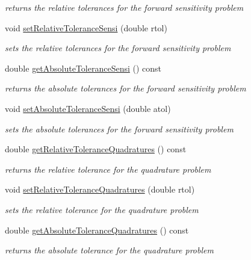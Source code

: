\begin{DoxyCompactItemize}
\begin{DoxyCompactList}\small\item\em returns the relative tolerances for the forward sensitivity problem \end{DoxyCompactList}\item 
void \mbox{\hyperlink{classamici_1_1_solver_a140b4219a601b17daf5f90f2255d1f22}{set\+Relative\+Tolerance\+Sensi}} (double rtol)
\begin{DoxyCompactList}\small\item\em sets the relative tolerances for the forward sensitivity problem \end{DoxyCompactList}\item 
double \mbox{\hyperlink{classamici_1_1_solver_aef5bbdb68233061923a99a5f448b263a}{get\+Absolute\+Tolerance\+Sensi}} () const
\begin{DoxyCompactList}\small\item\em returns the absolute tolerances for the forward sensitivity problem \end{DoxyCompactList}\item 
void \mbox{\hyperlink{classamici_1_1_solver_a6f804c48badcbc0dc32da4379c7ff091}{set\+Absolute\+Tolerance\+Sensi}} (double atol)
\begin{DoxyCompactList}\small\item\em sets the absolute tolerances for the forward sensitivity problem \end{DoxyCompactList}\item 
double \mbox{\hyperlink{classamici_1_1_solver_a40124a6593fea7f5ddbf39385b021a9e}{get\+Relative\+Tolerance\+Quadratures}} () const
\begin{DoxyCompactList}\small\item\em returns the relative tolerance for the quadrature problem \end{DoxyCompactList}\item 
void \mbox{\hyperlink{classamici_1_1_solver_a086428d30274f2b7e6f94e8e7593dd8b}{set\+Relative\+Tolerance\+Quadratures}} (double rtol)
\begin{DoxyCompactList}\small\item\em sets the relative tolerance for the quadrature problem \end{DoxyCompactList}\item 
double \mbox{\hyperlink{classamici_1_1_solver_a1f50a4e21784c2757530068483c405cb}{get\+Absolute\+Tolerance\+Quadratures}} () const
\begin{DoxyCompactList}\small\item\em returns the absolute tolerance for the quadrature problem \end{DoxyCompactList}\item 

\end{DoxyCompactItemize}
